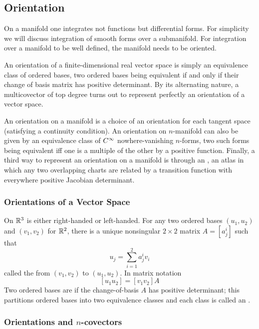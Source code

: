 \subsection{Orientation}

On a manifold one integrates not functions but differential forms. 
For simplicity we will discuss integration of smooth forms over a submanifold.
For integration over a manifold to be well defined, the manifold needs to be oriented.

An orientation of a finite-dimensional real vector space is simply an equivalence class of ordered bases, two ordered bases being equivalent if and only if their change of basis matrix has positive determinant. 
By its alternating nature, a multicovector of top degree turns out to represent perfectly an orientation of a vector space.

An orientation on a manifold is a choice of an orientation for each tangent space (satisfying a continuity condition).
An orientation on \(n\)-manifold can also be given by an equivalence class of \(C^\infty\) nowhere-vanishing \(n\)-forms, two such forms being equivalent iff one is a multiple of the other by a positive function.
Finally, a third way to represent an orientation on a manifold is through an , an atlas in which any two overlapping charts are related by a transition function with everywhere positive Jacobian determinant.

\subsubsection{Orientations of a Vector Space}

On \(\mathbb{R}^3\) is either right-handed or left-handed.
For any two ordered bases \((u_1, u_2)\) and \((v_1, v_2)\) for \(\mathbb{R}^2\), there is a unique nonsingular \(2 \times 2\) matrix \(A = \left[ a_j^i \right]\) such that 
\[
    u_j = \sum_{i=1}^2  a_j^i  v_i    
\]
called the  from \((v_1, v_2)\) to \((u_1, u_2)\).
In matrix notation
\[
    [u_1 u_2] = [v_1 v_2] A    
\]
Two ordered bases are  if the change-of-basis \(A\) has positive determinant; this partitions ordered bases into two equivalence classes and each class is called an .

\subsubsection{Orientations and \(n\)-covectors}

